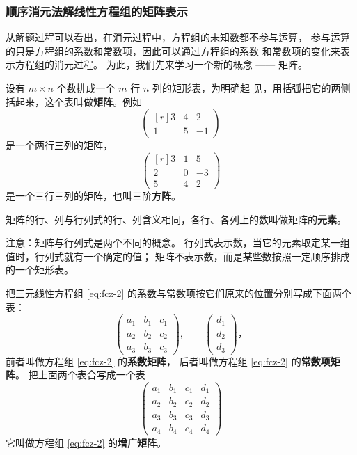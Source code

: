 \subsubsection{顺序消元法解线性方程组的矩阵表示}

从解题过程可以看出，在消元过程中，方程组的未知数都不参与运算，
参与运算的只是方程组的系数和常数项，因此可以通过方程组的系数
和常数项的变化来表示方程组的消元过程。
为此，我们先来学习一个新的概念 —— 矩阵。

设有 $m \times n$ 个数排成一个 $m$ 行 $n$ 列的矩形表，为明确起
见，用括弧把它的两侧括起来，这个表叫做\textbf{矩阵}。例如
$$\begin{pmatrix*}[r]
    3 & 4 & 2 \\
    1 & 5 & -1
\end{pmatrix*}$$
是一个两行三列的矩阵，
$$\begin{pmatrix*}[r]
    3 & 1 & 5 \\
    2 & 0 & -3 \\
    5 & 4 & 2
\end{pmatrix*}$$
是一个三行三列的矩阵，也叫三阶\textbf{方阵}。

矩阵的行、列与行列式的行、列含义相同，各行、各列上的数叫做矩阵的\textbf{元素}。

注意：矩阵与行列式是两个不同的概念。
行列式表示数，当它的元素取定某一组值时，行列式就有一个确定的值；
矩阵不表示数，而是某些数按照一定顺序排成的一个矩形表。

把三元线性方程组 \eqref{eq:fcz-2} 的系数与常数项按它们原来的位置分别写成下面两个表：
$$
\begin{pmatrix*}
    a_1 & b_1 & c_1 \\
	a_2 & b_2 & c_2 \\
	a_3 & b_3 & c_3
\end{pmatrix*}, \qquad
\begin{pmatrix*}
    d_1 \\
    d_2 \\
    d_3
\end{pmatrix*} \text{，}
$$
前者叫做方程组 \eqref{eq:fcz-2} 的\textbf{系数矩阵}，
后者叫做方程组 \eqref{eq:fcz-2} 的\textbf{常数项矩阵}。
把上面两个表合写成一个表
$$\begin{pmatrix*}
    a_1 & b_1 & c_1 & d_1 \\
	a_2 & b_2 & c_2 & d_2 \\
	a_3 & b_3 & c_3 & d_3 \\
	a_4 & b_4 & c_4 & d_4
\end{pmatrix*}$$
它叫做方程组 \eqref{eq:fcz-2} 的\textbf{增广矩阵}。

